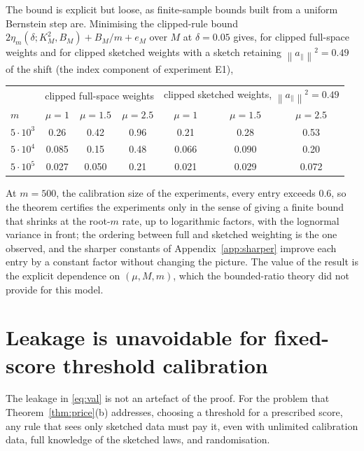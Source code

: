 \documentclass[11pt,a4paper]{article}
\newcommand{\norm}[1]{\left\|#1\right\|}
\theoremstyle{plain}
\theoremstyle{definition}
\theoremstyle{remark}
\begin{document}
The bound is explicit but loose, as finite-sample bounds built from a uniform Bernstein step are. Minimising the clipped-rule bound $2\eta_m(\delta;K_M^2,B_M)+B_M/m+e_M$ over $M$ at $\delta=0.05$ gives, for clipped full-space weights and for clipped sketched weights with a sketch retaining $\norm{a_\parallel}^2=0.49$ of the shift (the index component of experiment E1),
\begin{center}\small
\begin{tabular}{lcccccc}
\toprule
 & \multicolumn{3}{c}{clipped full-space weights} & \multicolumn{3}{c}{clipped sketched weights, $\norm{a_\parallel}^2=0.49$}\\
$m$ & $\mu=1$ & $\mu=1.5$ & $\mu=2.5$ & $\mu=1$ & $\mu=1.5$ & $\mu=2.5$\\
\midrule
$5\cdot10^3$ & 0.26 & 0.42 & 0.96 & 0.21 & 0.28 & 0.53\\
$5\cdot10^4$ & 0.085 & 0.15 & 0.48 & 0.066 & 0.090 & 0.20\\
$5\cdot10^5$ & 0.027 & 0.050 & 0.21 & 0.021 & 0.029 & 0.072\\
\bottomrule
\end{tabular}
\end{center}
At $m=500$, the calibration size of the experiments, every entry exceeds $0.6$, so the theorem certifies the experiments only in the sense of giving a finite bound that shrinks at the root-$m$ rate, up to logarithmic factors, with the lognormal variance in front; the ordering between full and sketched weighting is the one observed, and the sharper constants of Appendix~\ref{app:sharper} improve each entry by a constant factor without changing the picture. The value of the result is the explicit dependence on $(\mu,M,m)$, which the bounded-ratio theory did not provide for this model.
\section{Leakage is unavoidable for fixed-score threshold calibration}\label{sec:lb}

The leakage in \eqref{eq:val} is not an artefact of the proof. For the problem that Theorem~\ref{thm:price}(b) addresses, choosing a threshold for a prescribed score, any rule that sees only sketched data must pay it, even with unlimited calibration data, full knowledge of the sketched laws, and randomisation.
\end{document}
